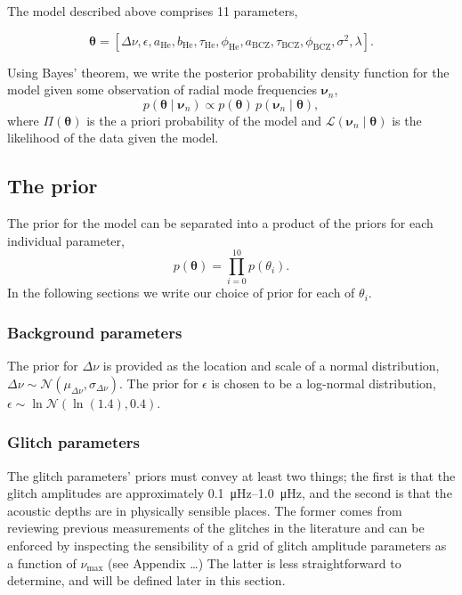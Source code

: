 \documentclass[linenumbers,modern,astrosymb,times]{aastex631dm}
\newcommand{\helium}{\mathrm{He}}
\newcommand{\bcz}{\mathrm{BCZ}}
\begin{document}
The model described above comprises 11 parameters,

\begin{equation}
    \bm\theta = [\Delta\nu, \epsilon, a_\helium, b_\helium, \tau_\helium,
    \phi_\helium, a_\bcz, \tau_\bcz, \phi_\bcz, \sigma^2, \lambda].
\end{equation}

Using Bayes' theorem, we write the posterior probability density function for
the model given some observation of radial mode frequencies \(\bm\nu_n\),
%
\begin{equation}
    p(\bm\theta \mid \bm\nu_n) \propto p(\bm\theta) \,
    p(\bm\nu_n \mid \bm\theta),
\end{equation}
%
where \(\Pi(\bm\theta)\) is the a priori probability of the model and
\(\mathcal{L}(\bm\nu_n \mid \bm\theta)\) is the likelihood of the data given the
model.


\subsection{The prior}\label{sec:prior}

The prior for the model can be separated into a product of the priors for each
individual parameter,
%
\begin{equation}
    p(\bm\theta) = \prod_{i=0}^{10} p(\theta_i).
\end{equation}
%
In the following sections we write our choice of prior for each of
\(\theta_i\).


\subsubsection{Background parameters}\label{sec:bkg-params}

The prior for \(\Delta\nu\) is provided as the location and scale of a
normal distribution, \(\Delta\nu \sim \mathcal{N}(\mu_{\Delta\nu},
\sigma_{\Delta\nu})\). The prior for \(\epsilon\) is chosen to be a log-normal
distribution, \(\epsilon \sim \ln\mathcal{N}(\ln(1.4), 0.4)\).


\subsubsection{Glitch parameters}\label{sec:glitch-params}

The glitch parameters' priors must convey at least two things; the first is
that the glitch amplitudes are approximately \SIrange{0.1}{1.0}{\micro\hertz},
and the second is that the acoustic depths are in physically sensible places.
The former comes from reviewing previous measurements of the glitches in the
literature and can be enforced by inspecting the sensibility of a grid of
glitch amplitude parameters as a function of \(\nu_\mathrm{max}\) (see
Appendix \ldots) The latter is less straightforward to determine, and will be
defined later in this section.
\end{document}
